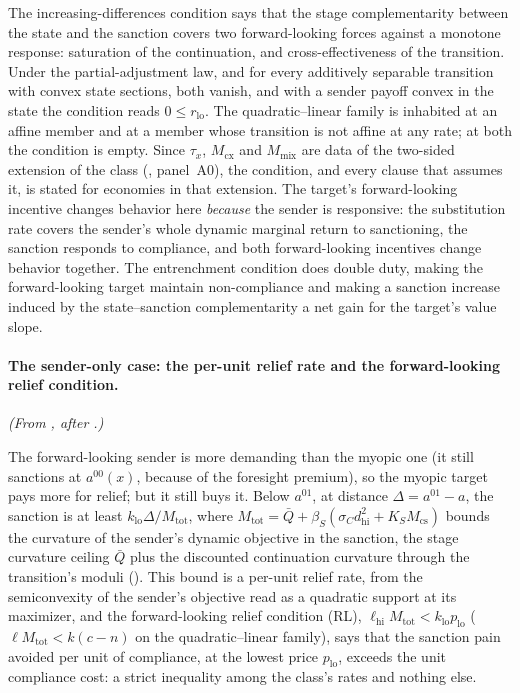 The increasing-differences condition says that the stage complementarity between the state and
the sanction covers two forward-looking forces against a monotone
response: saturation of the continuation, and cross-effectiveness of the
transition. Under the partial-adjustment law, and for every additively separable
transition with convex state sections, both vanish, and with a sender payoff
convex in the state the condition reads $0\le r_{\mathrm{lo}}$. The quadratic--linear
family is inhabited at an affine member and at a member whose
transition is not affine at any rate; at both the condition is empty. Since
$\tau_x$, $M_{\mathrm{cx}}$ and $M_{\mathrm{mix}}$ are data of the two-sided
extension of the class (, panel~A0), the condition, and
every clause that assumes it, is stated for economies in that extension. The
target's forward-looking incentive changes behavior here \emph{because} the sender is responsive: the
substitution rate covers the sender's whole dynamic marginal return to sanctioning, the sanction
responds to compliance, and both forward-looking incentives change behavior together. The
entrenchment condition does double duty, making the forward-looking target
maintain non-compliance and making a sanction increase induced by the state--sanction complementarity a net gain for the
target's value slope.

\paragraph{The sender-only case: the per-unit relief rate and the forward-looking relief condition.} \emph{(From , after .)}

The forward-looking sender is more demanding than the myopic one (it
still sanctions at $a^{00}(x)$, because of the foresight premium), so the
myopic target pays more for relief; but it still buys it. Below
$a^{01}$, at distance $\Delta=a^{01}-a$, the sanction is at least
$k_{\mathrm{lo}}\Delta/M_{\mathrm{tot}}$, where
$M_{\mathrm{tot}}=\bar Q+\beta_S(\sigma_Cd_{\mathrm{hi}}^2+K_SM_{\mathrm{cs}})$ bounds
the curvature of the sender's dynamic objective in the sanction, the stage
curvature ceiling $\bar Q$ plus the discounted continuation curvature through the
transition's moduli (). This bound is a per-unit relief
rate, from the semiconvexity of the sender's objective read as a quadratic
support at its maximizer, and
the forward-looking relief condition (RL), $\ell_{\mathrm{hi}}M_{\mathrm{tot}}<k_{\mathrm{lo}}p_{\mathrm{lo}}$
($\ell M_{\mathrm{tot}}<k(c-n)$ on the quadratic--linear family), says that the
sanction pain avoided per unit of compliance, at the lowest price $p_{\mathrm{lo}}$,
exceeds the unit compliance cost: a strict inequality among the class's
rates and nothing else.

